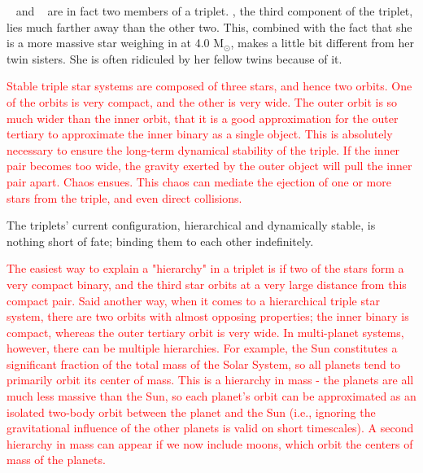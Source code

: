 \documentclass[main.tex]{subfiles}
\begin{document}
\par \nar \rmtaygete~ and \rmalcyone~ are in fact two members of a triplet.  \rmcelaeno, the third component of the triplet, lies much farther away than the other two.  This, combined with the fact that she is a more massive star weighing in at 4.0 M$_{\odot}$, makes \rmcelaeno a little bit different from her twin sisters.  She is often ridiculed by her fellow twins because of it.

\begin{tcolorbox}[sharp corners, colback=red!30, colframe=red!80!blue, title=Dynamical Stability]
\par \textcolor{red} {Stable triple star systems are composed of three stars, and hence two orbits.  One of the orbits is very compact, and the other is very wide.  The outer orbit is so much wider than the inner orbit, that it is a good approximation for the outer tertiary to approximate the inner binary as a single object.  This is absolutely necessary to ensure the long-term dynamical stability of the triple.  If the inner pair becomes too wide, the gravity exerted by the outer object will pull the inner pair apart.  Chaos ensues.  This chaos can mediate the ejection of one or more stars from the triple, and even direct collisions.}  
\end{tcolorbox}

\par \nar The triplets' current configuration, hierarchical and dynamically stable, is nothing short of fate; binding them to each other indefinitely.

\begin{tcolorbox}[sharp corners, colback=red!30, colframe=red!80!blue, title=Orbital Hierarchies]
\par \textcolor{red} {The easiest way to explain a "hierarchy" in a triplet is if two of the stars form a very compact binary, and the third star orbits at a very large distance from this compact pair.  
Said another way, when it comes to a hierarchical triple star system, there are two orbits with almost opposing properties; the inner binary is compact, whereas the outer tertiary orbit is very wide.  In multi-planet systems, however, there can be multiple hierarchies.  For example, the Sun constitutes a significant fraction of the total mass of the Solar System, so all planets tend to primarily orbit its center of mass.  This is a hierarchy in mass - the planets are all much less massive than the Sun, so each planet's orbit can be approximated as an isolated two-body orbit between the planet and the Sun (i.e., ignoring the gravitational influence of the other planets is valid on short timescales). A second hierarchy in mass can appear if we now include moons, which orbit the centers of mass of the planets.}
\end{tcolorbox}
\end{document}
